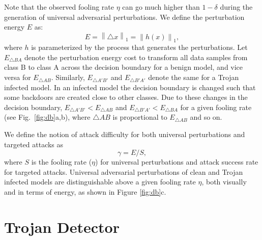 \documentclass{article}
\newcommand{\norm}[1]{\left\lVert#1\right\rVert}
\begin{document}
Note that the observed fooling rate $\eta$ can go much higher than $1-\delta$ during the generation of universal adversarial perturbations. We define the perturbation energy $E$ as:
\begin{equation}\label{eq:ef}
E = \norm{\triangle x}_1 = \norm{h(x)}_1,
\end{equation}  
where $h$ is parameterized by the process that generates the perturbations. Let $E_{\triangle BA}$ denote the perturbation energy cost to transform all data samples from class B to class A across the decision boundary for a benign model, and vice versa for $E_{\triangle AB}$. Similarly, $E_{\triangle A'B'}$ and $E_{\triangle B'A'}$ denote the same for a Trojan infected model. In an infected model the decision boundary is changed such that some backdoors are created close to other classes. Due to these changes in the decision boundary, $E_{\triangle A'B'} < E_{\triangle AB}$ and $E_{\triangle B'A'} < E_{\triangle BA}$ for a given fooling rate (see Fig.~\ref{fig:db}a,b), where $\triangle AB$ is proportional to $E_{\triangle AB}$ and so on. 












 


We define the notion of attack difficulty for both universal perturbations and targeted attacks as 
\begin{equation}\label{eq:defineAD}
\gamma = E / S,
\end{equation}
where $S$ is the fooling rate ($\eta$) for universal perturbations and attack success rate for targeted attacks. Universal adversarial perturbations of clean and Trojan infected models are distinguishable above a given fooling rate $\eta$, both visually and in terms of energy, as shown in Figure \ref{fig:db}c.















\vspace{-4mm}
\section{Trojan Detector}
\vspace{-3mm}
\end{document}
